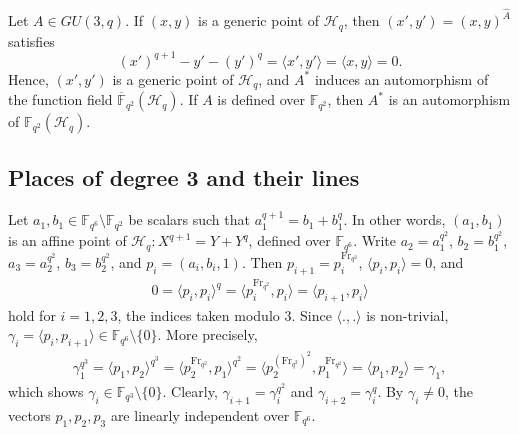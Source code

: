 \documentclass[entropy,article,submit,pdftex,moreauthors]{Definitions/mdpi}
\newcommand{\Frob}{{\mathrm{Fr}_{q^2}}}
\begin{document}
Let $A\in GU(3,q)$. If $(x,y)$ is a generic point of $\mathscr{H}_q$, then $(x',y')=(x,y)^{\hat{A}}$ satisfies 
\[(x')^{q+1}-y'-(y')^q=\langle x',y' \rangle = \langle x,y \rangle=0. \]
Hence, $(x',y')$ is a generic point of $\mathscr{H}_q$, and $A^*$ induces an automorphism of the function field $\overline{\mathbb{F}}_{q^2}(\mathscr{H}_q)$. If $A$ is defined over $\mathbb{F}_{q^2}$, then $A^*$ is an automorphism of $\mathbb{F}_{q^2}(\mathscr{H}_q)$. 



\subsection{Places of degree 3 and their lines} \label{ssec:places-lines}
Let $a_1,b_1 \in \mathbb{F}_{q^6}\setminus \mathbb{F}_{q^2}$ be scalars such that $a_1^{q+1}=b_1+b_1^q$. In other words, $(a_1,b_1)$ is an affine point of $\mathscr{H}_q:X^{q+1}=Y+Y^q$, defined over $\mathbb{F}_{q^6}$. Write $a_2=a_1^{q^2}$, $b_2=b_1^{q^2}$, $a_3=a_2^{q^2}$, $b_3=b_2^{q^2}$, and $p_i=(a_i,b_i,1)$. Then $p_{i+1}=p_i^\Frob$, $\langle p_i,p_i \rangle = 0$, and 
\begin{align*} %
0=\langle p_i,p_i \rangle ^q = \langle p_i^\Frob,p_i \rangle = \langle p_{i+1},p_i \rangle
\end{align*}
hold for $i=1,2,3$, the indices taken modulo $3$. Since $\langle .,. \rangle$ is non-trivial, $\gamma_i = \langle p_i,p_{i+1} \rangle \in \mathbb{F}_{q^6}\setminus \{0\}$. More precisely,
\begin{align*} %
\gamma_1^{q^3}=\langle p_1,p_{2} \rangle^{q^3} = \langle p_2^\Frob,p_{1} \rangle^{q^2} = \langle p_2^{(\Frob)^2},p_{1}^\Frob \rangle = \langle p_1,p_2 \rangle = \gamma_1,
\end{align*}
which shows $\gamma_i \in \mathbb{F}_{q^3}\setminus \{0\}$. Clearly, $\gamma_{i+1} = \gamma_i^{q^2}$ and $\gamma_{i+2} = \gamma_i^{q}$. By $\gamma_i\neq 0$, the vectors $p_1,p_2,p_3$ are linearly independent over $\mathbb{F}_{q^6}$. 
\end{document}

